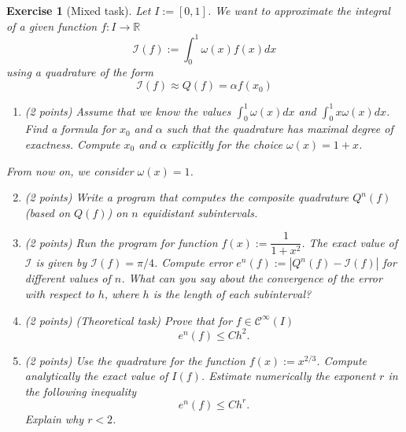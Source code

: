 \documentclass[11pt,a4paper,english,hyperref]{article}
\newcounter{aufgabeNummer}
\theoremstyle{break}   %
\newtheorem{Aufgabe}[aufgabeNummer]{Exercise}
\begin{document}
\begin{Aufgabe}[Mixed task]
Let $I:=[0,1]$. We want to approximate the integral of a given function $f:I\to \mathbb{R}$ 
$$\mathcal{I}(f):=\int_0 ^ 1 \omega(x) f(x)dx
$$
using a quadrature of the form
$$\mathcal{I}(f)\approx Q(f)=\alpha f\left(x_0\right)
$$
\begin{enumerate}
\item (2 points) Assume that we know the values \(\int_0^1 \omega(x)dx\) and \(\int_0^1 x \omega(x)dx\). Find a formula for \(x_0\) and \(\alpha\) such that the quadrature has maximal degree of exactness. Compute \(x_0\) and \(\alpha\) explicitly for the choice \(\omega(x) = 1+x\).
\end{enumerate}
\noindent From now on, we consider \(\omega(x) = 1\).
\begin{enumerate}
\setcounter{enumi}{1}
\item (2 points) Write a program that computes the composite quadrature \(Q^n(f)\) (based on \(Q(f)\)) on \(n\) equidistant subintervals. 
\item (2 points) Run the program for function $f(x):=\dfrac{1}{1 + x^2}$. The exact value of \(\mathcal{I}\) is given by $\mathcal{I}(f)=\pi/4$. Compute error $e^n(f):=|Q^n(f)-\mathcal{I}(f)|$ for different values of $n$. What can you say about the convergence of the error with respect to $h$, where $h$ is the length of each subinterval?
\item (2 points) (Theoretical task) Prove that for $f\in \mathcal{C}^\infty (I)$ $$e^n(f)\leq Ch^2.$$ %
\item (2 points) Use the quadrature for the function $f(x):=x^{2/3}$. Compute analytically the exact value of $I(f)$. Estimate numerically the exponent $r$ in the following inequality 
$$e^n(f) \leq Ch^r.$$
Explain why $r<2$.
\end{enumerate}
\end{Aufgabe}
\end{document}
